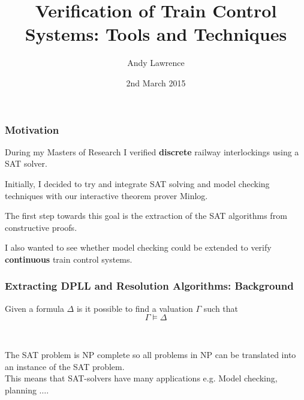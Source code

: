 \documentclass{beamer}
\title{Verification of Train Control Systems: Tools and Techniques}
\author[Andy Lawrence]{Andy Lawrence}
\date{2nd March 2015}
\begin{document}
\begin{frame}
\titlepage

\end{frame}



\begin{frame}
\frametitle{Motivation}
During my Masters of Research I verified \textbf{discrete} railway interlockings using a SAT solver. \\

\medskip

Initially, I decided to try and integrate SAT solving and model checking techniques with our interactive theorem prover Minlog. \\

\medskip

The first step towards this goal is the extraction of the SAT algorithms from constructive proofs. \\

\medskip

I also wanted to see whether model checking could be extended to verify \textbf{continuous} train control systems.

\end{frame}

\begin{frame}
\frametitle{Extracting DPLL and Resolution Algorithms: Background}
\begin{definition}
Given a formula $\Delta$ is it possible to find a valuation $\Gamma$ such that
 $$\Gamma \models \Delta$$
\end{definition} \hspace*{5pt }\\
\bigskip

The SAT problem is NP complete so all problems in NP can be translated into an instance of the SAT problem.\\
\medskip
This means that SAT-solvers have many applications e.g. Model checking, planning $\ldots$.

\end{frame}
\end{document}
